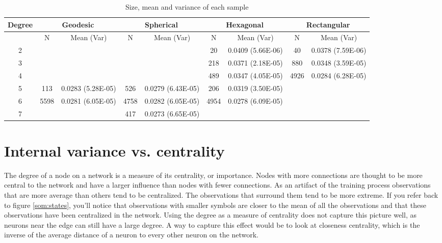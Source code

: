 \begin{table}
\centering
\scriptsize
\begin{minipage}{\textwidth}
\caption{Size, mean and variance of each sample}
\label{meanvar1}
\begin{tabular}{|c||cc|cc|cc|cc|}
\hline
\textbf{Degree} & \multicolumn{2}{c|}{\textbf{Geodesic}} &
\multicolumn{2}{c|}{\textbf{Spherical}} &
\multicolumn{2}{c|}{\textbf{Hexagonal}} &
\multicolumn{2}{c|}{\textbf{Rectangular}} \\
\hline
& N & Mean (Var) & N & Mean (Var) & N & Mean (Var) & N & Mean (Var) \\
\hline
2&&&&& 20& 0.0409 (5.66E-06)& 40& 0.0378 (7.59E-06)\\ 
3&&&&& 218& 0.0371 (2.18E-05)& 880& 0.0348 (3.59E-05)\\ 
4&&&&& 489& 0.0347 (4.05E-05)& 4926& 0.0284 (6.28E-05)\\ 
5& 113& 0.0283 (5.28E-05)& 526& 0.0279 (6.43E-05)& 206& 0.0319 (3.50E-05)&&\\ 
6& 5598& 0.0281 (6.05E-05)& 4758& 0.0282 (6.05E-05)& 4954& 0.0278
(6.09E-05)&&\\ 
7&&& 417& 0.0273 (6.65E-05)&&&&\\ 
\hline
\end{tabular} \end{minipage} \end{table}






\section{Internal variance vs. centrality}
\label{rdq2}
The degree of a node on a network is a measure of its centrality, or
importance. Nodes with more connections are thought to be more central to
the network and have a larger influence than nodes with fewer connections. As an
artifact of the training process observations that are more average than
others tend to be centralized.  The observations that surround them tend to be
more extreme.  If you refer back to figure \ref{som:states}, you'll notice that
observations with smaller symbols are closer to the mean of all the
observations and that these observations have been centralized in the network.
Using the degree as a measure of centrality does not capture this picture
well, as neurons near the edge can still have a large degree.  A way to
capture this effect would be to look at closeness centrality, which is the
inverse of the average distance of a neuron to every other neuron on the
network.

